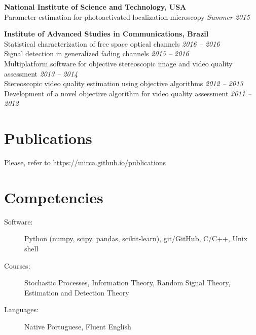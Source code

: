 \documentclass[10pt]{article}
\begin{document}
\begin{titlepage}
    \textbf{National Institute of Science and Technology, USA}\\
    Parameter estimation for photoactivated localization microscopy
    \hfill \textit{Summer 2015}
    \vspace{.5cm}

    \textbf{Institute of Advanced Studies in Communications, Brazil}\\
    Statistical characterization of free space optical channels \hfill \emph{2016 -- 2016}  \\
    Signal detection in generalized fading channels \hfill \emph{2015 -- 2016} \\
    Multiplatform software for objective stereoscopic image and video quality assessment \hfill \emph{2013 -- 2014} \\
    Stereoscopic video quality estimation using objective algorithms \hfill \emph{2012 -- 2013} \\
    Development of a novel objective algorithm for video quality assessment \hfill \emph{2011 -- 2012}

\section*{Publications}
Please, refer to \url{https://mirca.github.io/publications}

\section*{Competencies}
\begin{description}
    \item[Software:] Python (numpy, scipy, pandas, scikit-learn), git/GitHub, C/C++, Unix shell
    \item[Courses:] Stochastic Processes, Information Theory, Random Signal Theory, Estimation and Detection Theory
    \item[Languages:] Native Portuguese, Fluent English
\end{description}


\end{titlepage}
\end{document}
